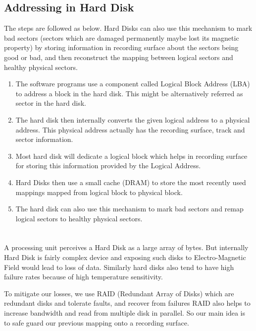 \documentclass[12pt]{article}
\begin{document}
\subsection{Addressing in Hard Disk}
The steps are followed as below. Hard Disks can also use this mechanism to mark bad sectors (sectors which are damaged permanently maybe lost its magnetic property) by storing information in recording surface about the sectors being good or bad, and then reconstruct the mapping between logical sectors and healthy physical sectors.
\begin{enumerate}
    \item The software programs use a component called Logical Block Address (LBA) to address a block in the hard disk. This might be alternatively referred as sector in the hard disk.
    \item The hard disk then internally converts the given logical address to a physical address. This physical address actually has the recording surface, track and sector information. 
    \item Most hard disk will dedicate a logical block which helps in recording surface for storing this information provided by the Logical Address.
    \item Hard Disks then use a small cache (DRAM) to store the most recently used mappings mapped from logical block to physical block.
    \item The hard disk can also use this mechanism to mark bad sectors and remap logical sectors to healthy physical sectors.
\end{enumerate}


\section{}
A processing unit perceives a Hard Disk as a large array of bytes. But internally Hard Disk is fairly complex device and exposing such disks to Electro-Magnetic Field would lead to loss of data. Similarly hard disks also tend to have high failure rates because of high temperature sensitivity.

To mitigate our losses, we use RAID (Redundant Array of Disks) which are redundant disks and tolerate faults, and recover from failures RAID also helps to increase bandwidth and read from multiple disk in parallel. So our main idea is to safe guard our previous mapping onto a recording surface.
\end{document}
